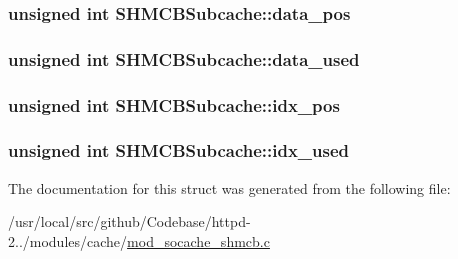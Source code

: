 \subsubsection[{\texorpdfstring{data\+\_\+pos}{data_pos}}]{\setlength{\rightskip}{0pt plus 5cm}unsigned {\bf int} S\+H\+M\+C\+B\+Subcache\+::data\+\_\+pos}\hypertarget{structSHMCBSubcache_a441423e4aa2c20b4368df1079fda7e35}{}\label{structSHMCBSubcache_a441423e4aa2c20b4368df1079fda7e35}
\subsubsection[{\texorpdfstring{data\+\_\+used}{data_used}}]{\setlength{\rightskip}{0pt plus 5cm}unsigned {\bf int} S\+H\+M\+C\+B\+Subcache\+::data\+\_\+used}\hypertarget{structSHMCBSubcache_a650116349bcf167b1f43e02aff27b21b}{}\label{structSHMCBSubcache_a650116349bcf167b1f43e02aff27b21b}
\subsubsection[{\texorpdfstring{idx\+\_\+pos}{idx_pos}}]{\setlength{\rightskip}{0pt plus 5cm}unsigned {\bf int} S\+H\+M\+C\+B\+Subcache\+::idx\+\_\+pos}\hypertarget{structSHMCBSubcache_ae877bd76f8197ad01437c55d0cf1ab68}{}\label{structSHMCBSubcache_ae877bd76f8197ad01437c55d0cf1ab68}
\subsubsection[{\texorpdfstring{idx\+\_\+used}{idx_used}}]{\setlength{\rightskip}{0pt plus 5cm}unsigned {\bf int} S\+H\+M\+C\+B\+Subcache\+::idx\+\_\+used}\hypertarget{structSHMCBSubcache_a3942b5817e88d59f8c330e93ec0094b6}{}\label{structSHMCBSubcache_a3942b5817e88d59f8c330e93ec0094b6}


The documentation for this struct was generated from the following file\+:\begin{DoxyCompactItemize}
\item 
/usr/local/src/github/\+Codebase/httpd-\/2../modules/cache/\hyperlink{mod__socache__shmcb_8c}{mod\+\_\+socache\+\_\+shmcb.\+c}\end{DoxyCompactItemize}

